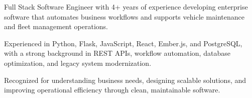 
\begin{cvparagraph}

Full Stack Software Engineer with 4+ years of experience developing enterprise software that automates business workflows and supports vehicle maintenance and fleet management operations.

Experienced in Python, Flask, JavaScript, React, Ember.js, and PostgreSQL, with a strong background in REST APIs, workflow automation, database optimization, and legacy system modernization.

Recognized for understanding business needs, designing scalable solutions, and improving operational efficiency through clean, maintainable software.

\end{cvparagraph}